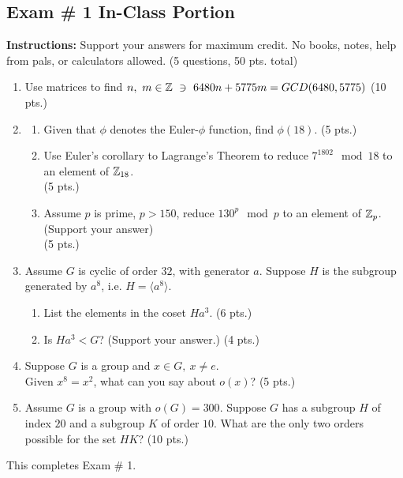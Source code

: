 \subsection{Exam \# 1 In-Class Portion}
\textbf{Instructions:} Support your answers for maximum credit. No books, notes, help from pals, or calculators allowed. (5 questions, 50 pts. total)
\vspace{0.1in}
\begin{enumerate}
    \setlength{\itemsep}{15pt} %
    \item Use matrices to find $n,\ m \in \Z \ \ni \ 6480n+5775m = GCD(6480,5775)$ \hfill (10 pts.)
    \newpage
    \item 
\begin{enumerate}
    \setlength{\itemsep}{10pt} %
    \item[(a)] Given that $\phi$ denotes the Euler-$\phi$ function, find $\phi(18)$. \hfill (5 pts.)
    \vspace{2.25in}
    \item[(b)] Use Euler's corollary to Lagrange's Theorem to reduce $7^{1802}\mod 18$ to an element of ${\mathbb{Z}}_{18}$. \\ 
    \mbox{} \hfill (5 pts.)
    \vspace{2.25in}
    \item[(c)] Assume $p$ is prime, $p>150$, reduce $130^p \mod p$ to an element of ${\mathbb{Z}}_p$. (Support your answer) \\ 
    \mbox{} \hfill (5 pts.)
    
\end{enumerate}
\newpage
\item Assume $G$ is cyclic of order $32$, with generator $a$. Suppose $H$ is the subgroup generated by $a^8$, i.e. $H= \langle a^8 \rangle$.
\begin{enumerate}
    \setlength{\itemsep}{10pt} %
    \item[(a)] List the elements in the coset $Ha^3$. \hfill (6 pts.)
    \vspace{2.5in}
    \item[(b)] Is $Ha^3<G$? (Support your answer.) \hfill (4 pts.)
    \vspace{2.5in}
\end{enumerate}
\item Suppose $G$ is a group and $x\in G, \ x\neq e$. \\
Given $x^8=x^2$, what can you say about $o(x)$? \hfill (5 pts.)
\newpage
\item Assume $G$ is a group with $o(G)=300$. Suppose $G$ has a subgroup $H$ of index $20$ and a subgroup $K$ of order $10$. What are the only two orders possible for the set $HK$? \hfill (10 pts.)
\end{enumerate}
\vfill
\begin{tcolorbox}
    \begin{center}
        This completes Exam \# 1.
    \end{center}
\end{tcolorbox}
\newpage
